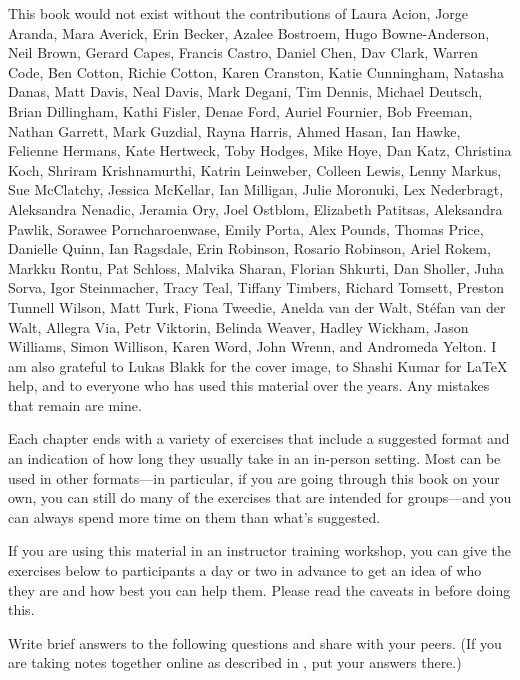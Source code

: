 
This book would not exist without the contributions of
Laura Acion,
Jorge Aranda,
Mara Averick,
Erin Becker,
Azalee Bostroem,
Hugo Bowne-Anderson,
Neil Brown,
Gerard Capes,
Francis Castro,
Daniel Chen,
Dav Clark,
Warren Code,
Ben Cotton,
Richie Cotton,
Karen Cranston,
Katie Cunningham,
Natasha Danas,
Matt Davis,
Neal Davis,
Mark Degani,
Tim Dennis,
Michael Deutsch,
Brian Dillingham,
Kathi Fisler,
Denae Ford,
Auriel Fournier,
Bob Freeman,
Nathan Garrett,
Mark Guzdial,
Rayna Harris,
Ahmed Hasan,
Ian Hawke,
Felienne Hermans,
Kate Hertweck,
Toby Hodges,
Mike Hoye,
Dan Katz,
Christina Koch,
Shriram Krishnamurthi,
Katrin Leinweber,
Colleen Lewis,
Lenny Markus,
Sue McClatchy,
Jessica McKellar,
Ian Milligan,
Julie Moronuki,
Lex Nederbragt,
Aleksandra Nenadic,
Jeramia Ory,
Joel Ostblom,
Elizabeth Patitsas,
Aleksandra Pawlik,
Sorawee Porncharoenwase,
Emily Porta,
Alex Pounds,
Thomas Price,
Danielle Quinn,
Ian Ragsdale,
Erin Robinson,
Rosario Robinson,
Ariel Rokem,
Markku Rontu,
Pat Schloss,
Malvika Sharan,
Florian Shkurti,
Dan Sholler,
Juha Sorva,
Igor Steinmacher,
Tracy Teal,
Tiffany Timbers,
Richard Tomsett,
Preston Tunnell Wilson,
Matt Turk,
Fiona Tweedie,
Anelda van der Walt,
Stéfan van der Walt,
Allegra Via,
Petr Viktorin,
Belinda Weaver,
Hadley Wickham,
Jason Williams,
Simon Willison,
Karen Word,
John Wrenn,
and Andromeda Yelton.
I am also grateful to Lukas Blakk for the cover image,
to Shashi Kumar for LaTeX help,
and to everyone who has used this material over the years.
Any mistakes that remain are mine.


Each chapter ends with a variety of exercises that include a suggested format
and an indication of how long they usually take in an in-person setting.
Most can be used in other formats---in particular,
if you are going through this book on your own,
you can still do many of the exercises that are intended for groups---and
you can always spend more time on them than what's suggested.

If you are using this material in an instructor training workshop,
you can give the exercises below to participants a day or two in advance
to get an idea of who they are and how best you can help them.
Please read the caveats in  before doing this.


Write brief answers to the following questions and share with your peers.
(If you are taking notes together online as described in ,
put your answers there.)

